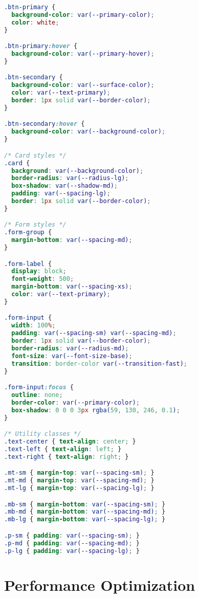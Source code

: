 \documentclass[12pt,a4paper]{article}
\begin{document}
\begin{lstlisting}[language=CSS, caption=Global CSS Variables]
.btn-primary {
  background-color: var(--primary-color);
  color: white;
}

.btn-primary:hover {
  background-color: var(--primary-hover);
}

.btn-secondary {
  background-color: var(--surface-color);
  color: var(--text-primary);
  border: 1px solid var(--border-color);
}

.btn-secondary:hover {
  background-color: var(--background-color);
}

/* Card styles */
.card {
  background: var(--background-color);
  border-radius: var(--radius-lg);
  box-shadow: var(--shadow-md);
  padding: var(--spacing-lg);
  border: 1px solid var(--border-color);
}

/* Form styles */
.form-group {
  margin-bottom: var(--spacing-md);
}

.form-label {
  display: block;
  font-weight: 500;
  margin-bottom: var(--spacing-xs);
  color: var(--text-primary);
}

.form-input {
  width: 100%;
  padding: var(--spacing-sm) var(--spacing-md);
  border: 1px solid var(--border-color);
  border-radius: var(--radius-md);
  font-size: var(--font-size-base);
  transition: border-color var(--transition-fast);
}

.form-input:focus {
  outline: none;
  border-color: var(--primary-color);
  box-shadow: 0 0 0 3px rgba(59, 130, 246, 0.1);
}

/* Utility classes */
.text-center { text-align: center; }
.text-left { text-align: left; }
.text-right { text-align: right; }

.mt-sm { margin-top: var(--spacing-sm); }
.mt-md { margin-top: var(--spacing-md); }
.mt-lg { margin-top: var(--spacing-lg); }

.mb-sm { margin-bottom: var(--spacing-sm); }
.mb-md { margin-bottom: var(--spacing-md); }
.mb-lg { margin-bottom: var(--spacing-lg); }

.p-sm { padding: var(--spacing-sm); }
.p-md { padding: var(--spacing-md); }
.p-lg { padding: var(--spacing-lg); }
\end{lstlisting}

\section{Performance Optimization}
\end{document}
